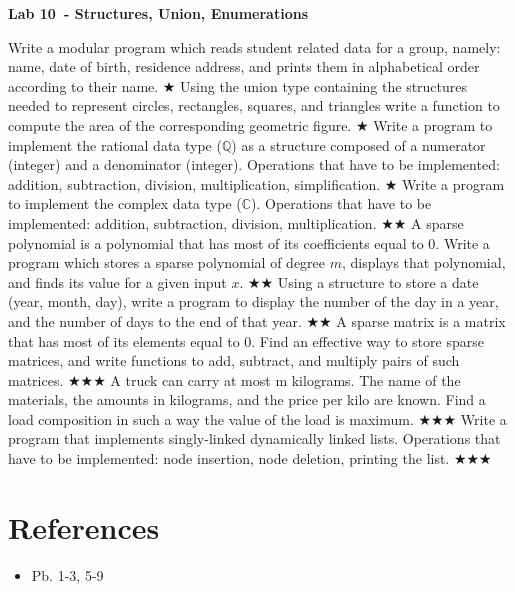 \documentclass{exam}
\newcommand\labnr{10}
\newcommand\lab{Lab \labnr\ - Structures, Union, Enumerations}
\newcommand\lvlez{$\bigstar$}
\newcommand\lvlmed{\lvlez\lvlez}
\newcommand\lvlhard{\lvlmed\lvlez}
\begin{document}
\begin{center}
   \vspace*{0cm}
   \bfseries\LARGE
   \lab
   \vspace*{1cm}
\end{center}

\begin{questions}
   \question Write a modular program which reads student related data for a group, namely: name, date of
birth, residence address, and prints them in alphabetical order according to their name. \lvlez
   \question Using the union type containing the structures needed to represent circles, rectangles, squares,
and triangles write a function to compute the area of the corresponding geometric figure. \lvlez
   \question Write a program to implement the rational data type ($\mathbb{Q}$) as a structure composed of a numerator (integer) and a
denominator (integer). 
   Operations that have to be implemented: addition, subtraction, division, multiplication, simplification. \lvlez
   \question Write a program to implement the complex data type ($\mathbb{C}$). 
   Operations that have to be implemented: addition, subtraction, division, multiplication. \lvlmed
   \question A sparse polynomial is a polynomial that has most of its coefficients equal to 0. Write a program which stores a sparse polynomial of degree $m$, displays that polynomial, and finds its value for a given input $x$. \lvlmed
   \question Using a structure to store a date (year, month, day), write a program to display the
number of the day in a year, and the number of days to the end of that year. \lvlmed
   \question A sparse matrix is a matrix that has most of its elements equal to 0. Find an effective way to store sparse matrices, and write functions to add, subtract, and multiply pairs of such matrices. \lvlhard
   \question A truck can carry at most
m kilograms. The name of the materials, the amounts in kilograms, and
the price per kilo are known. Find a load composition in such a way the value of the load is
maximum. \lvlhard
   \question Write a program that implements singly-linked dynamically linked lists. Operations that have to be implemented: node insertion, node deletion, printing the list. \lvlhard
\end{questions}
\medskip
\section*{References}
\begin{itemize}
   \item Pb. 1-3, 5-9 \cite{cplab10}
\end{itemize}
\printbibliography[heading=none]
\end{document}
